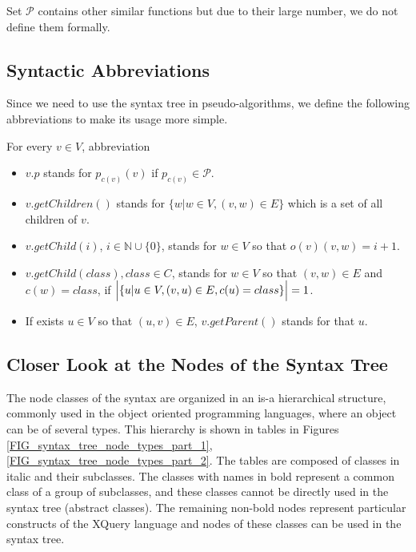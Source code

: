 Set $\mathcal{P}$ contains other similar functions but due to their large number, we do not define them formally.


\subsection{Syntactic Abbreviations}
Since we need to use the syntax tree in pseudo-algorithms, we define the following abbreviations to make its usage more simple.

For every $v \in V$, abbreviation
\begin{itemize}
\item $v.p$ stands for $p_{c(v)}(v)$ if $p_{c(v)} \in \mathcal{P}$.
\item $v.getChildren()$ stands for $\{w | w \in V, (v,w) \in E\}$ which is a set of all children of $v$.
\item $v.getChild(i)$, $i \in \mathbb{N} \cup \{0\}$, stands for $w \in V$ so that $o(v)(v,w) = i + 1$.
\item $v.getChild(class), class \in C$, stands for $w \in V$ so that $(v,w) \in E$ and $c(w) = class$, if $\Bigl | \{u | u \in V, (v,u) \in E, c(u) = class\}\Bigr | = 1$.
\item If exists $u \in V$ so that $(u,v) \in E$, $v.getParent()$ stands for that $u$.
\end{itemize}


\subsection{Closer Look at the Nodes of the Syntax Tree}
The node classes of the syntax are organized in an is-a hierarchical structure, commonly used in the object oriented programming languages, where an object can be of several types. This hierarchy is shown in tables in Figures \ref{FIG_syntax_tree_node_types_part_1}, \ref{FIG_syntax_tree_node_types_part_2}. The tables are composed of classes in italic and their subclasses. The classes with names in bold represent a common class of a group of subclasses, and these classes cannot be directly used in the syntax tree (abstract classes). The remaining non-bold nodes represent particular constructs of the XQuery language and nodes of these classes can be used in the syntax tree. 

